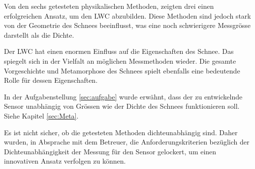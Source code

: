 
Von den sechs getesteten physikalischen Methoden, zeigten drei einen erfolgreichen Ansatz, um den LWC abzubilden. Diese Methoden sind jedoch stark von der Geometrie des Schnees beeinflusst, was eine noch schwierigere Messgrösse darstellt als die Dichte.

Der LWC hat einen enormen Einfluss auf die Eigenschaften des Schnee. Das spiegelt sich in der Vielfalt an möglichen Messmethoden wieder. Die gesamte Vorgeschichte und Metamorphose des Schnees spielt ebenfalls eine bedeutende Rolle für dessen Eigenschaften.

In der Aufgabenstellung \ref{sec:aufgabe} wurde erwähnt, dass der zu entwickelnde Sensor unabhängig von Grössen wie der Dichte des Schnees funktionieren soll. Siehe Kapitel \ref{sec:Meta}.


Es ist nicht sicher, ob die getesteten Methoden dichteunabhängig sind. Daher wurden, in Absprache mit dem Betreuer, die Anforderungskriterien bezüglich der Dichteunabhängigkeit der Messung für den Sensor gelockert, um einen innovativen Ansatz verfolgen zu können.
